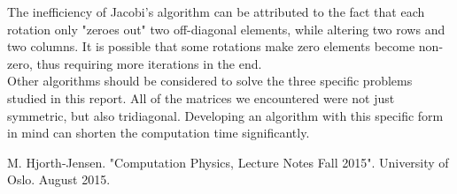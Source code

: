 \documentclass[prb,aps,twocolumn,showpacs,10pt]{revtex4-1}
\begin{document}
The inefficiency of Jacobi's algorithm can be attributed to the fact that each rotation only "zeroes out" two off-diagonal elements, while altering two rows and two columns. It is possible that some rotations make zero elements become non-zero, thus requiring more iterations in the end.\\

Other algorithms should be considered to solve the three specific problems studied in this report. All of the matrices we encountered were not just symmetric, but also tridiagonal. Developing an algorithm with this specific form in mind can shorten the computation time significantly. \\






\newpage 
\begin{references}
 M. Hjorth-Jensen. "Computation Physics, Lecture Notes Fall 2015". University of Oslo. August 2015.
\end{references}
\end{document}
